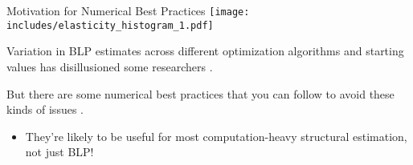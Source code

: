 \documentclass[aspectratio=169,t,11pt,table]{beamer}
\begin{document}
\begin{frame}{Motivation for Numerical Best Practices}
    \texttt{[image: includes/elasticity\_histogram\_1.pdf]}
    \begin{wideitemize}
        \item Variation in BLP estimates across different optimization algorithms and starting values has disillusioned some researchers \citep{knittel2014estimation}.
        \pause
        \item But there are some numerical best practices that you can follow to avoid these kinds of issues \citep{conlon2020best}.
        \begin{itemize}
            \item They're likely to be useful for most computation-heavy structural estimation, not just BLP!
        \end{itemize}
    \end{wideitemize}
\end{frame}
\end{document}
